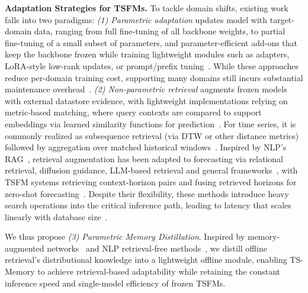 \noindent\textbf{Adaptation Strategies for TSFMs.} 
To tackle domain shifts, existing work falls into two paradigms: \textit{(1) Parametric adaptation} updates model with target-domain data, ranging from full fine-tuning of all backbone weights, to partial fine-tuning of a small subset of parameters, and parameter-efficient add-ons that keep the backbone frozen while training lightweight modules such as adapters, LoRA-style low-rank updates, or prompt/prefix tuning~\cite{gupta2024low,gupta2024beyond,qiao2025multi,zhao2025less}. While these approaches reduce per-domain training cost, supporting many domains still incurs substantial maintenance overhead~\cite{ning2025mode,lee2025lightweight,sheng2023s}.
\textit{(2) Non-parametric retrieval} augments frozen models with external datastore evidence, with lightweight implementations relying on metric-based matching, where query contexts are compared to support embeddings via learned similarity functions for prediction~\cite{koch2015siamese,vinyals2016matching,snell2017prototypical,sung2018learning,oreshkin2018tadam}. For time series, it is commonly realized as subsequence retrieval (via DTW or other distance metrics) followed by aggregation over matched historical windows~\cite{tajmouati2024knn,martinez2019knn,martinez2018dealing,martinez2019tsfknn}. Inspired by NLP's RAG~\cite{lewis2020retrieval}, retrieval augmentation has been adapted to forecasting via relational retrieval, diffusion guidance, LLM-based retrieval and general frameworks~\cite{jing2022retrieval,liu2024retrieval,yang2025timerag,han2025retrieval}, with TSFM systems retrieving context-horizon pairs and fusing retrieved horizons for zero-shot forecasting~\cite{ning2025ts}. Despite their flexibility, these methods introduce heavy search operations into the critical inference path, leading to latency that scales linearly with database size~\cite{fan2024survey}.

We thus propose \textit{(3) Parametric Memory Distillation}. Inspired by memory-augmented networks~\cite{graves2014neural,weston2014memory} and NLP retrieval-free methods~\cite{tay2022transformer,izacard2021distilling}, we distill offline retrieval's distributional knowledge into a lightweight offline module, enabling TS-Memory to achieve retrieval-based adaptability while retaining the constant inference speed and single-model efficiency of frozen TSFMs.

